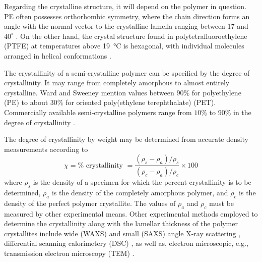 Regarding the crystalline structure, it will depend on the polymer in question.
PE often possesses orthorhombic symmetry, where the chain direction forms an angle with the normal vector to the crystalline lamella ranging between 17 and $40^\circ$ \citep{nikolovMicroMacroConstitutive2000}.
On the other hand, the crystal structure found in polytetrafluoroethylene (PTFE) at temperatures above \SI{19}{\celsius} is hexagonal, with individual molecules arranged in helical conformations \citep{bergstromMechanicsSolidPolymers2015}.

The crystallinity of a semi-crystalline polymer can be specified by the degree of crystallinity.
It may range from completely amorphous to almost entirely crystalline.
Ward and Sweeney \citep{wardIntroductionMechanicalProperties2004} mention values between $90\%$ for polyethylene (PE) to about $30\%$ for oriented poly(ethylene terephthalate) (PET).
Commercially available semi-crystalline polymers range from $10\%$ to $90\%$ in the degree of crystallinity \citep{vandommelenMicromechanicalModelingElastoviscoplastic2003}.

The degree of crystallinity by weight may be determined from accurate density measurements according to
\begin{equation}
	\chi = \% \text { crystallinity }=\frac{\left(\rho_{s}-\rho_{a}\right)/\rho_{s}}{\left(\rho_{c}-\rho_{a}\right)/\rho_{c}} \times 100
\end{equation}
where $\rho_{s}$ is the density of a specimen for which the percent crystallinity is to be determined, $\rho_{a}$ is the density of the completely amorphous polymer, and $\rho_{c}$ is the density of the perfect polymer crystallite.
The values of $\rho_{a}$ and $\rho_{c}$ must be measured by other experimental means.
Other experimental methods employed to determine the crystallinity along with the lamellar thickness of the polymer crystallites include wide (WAXS) and small (SAXS) angle X-ray scattering \citep{schrauwenIntrinsicDeformationBehavior2004, hobeikaTemperatureStrainRate2000}, differential scanning calorimetery (DSC) \citep{ayoubEffectsCrystalContent2011}, as well as, electron microscopic, e.g., transmission electron microscopy (TEM) \citep{bartczakEvolutionCrystallineTexture1992}.

